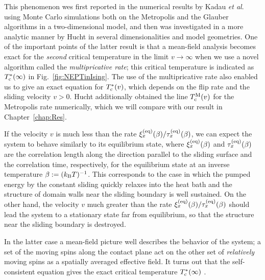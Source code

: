 This phenomenon wes first reported in the numerical results by Kadau \textit{et al}.\ \cite{Kadau2008} using Monte Carlo simulations both on the Metropolis and the Glauber algorithms in a two-dimensional model, and then was investigated in a more analytic manner by Hucht \cite{Hucht2009b} in several dimensionalities and model geometries. One of the important points of the latter result is that a mean-field analysis becomes exact for the \textit{second} critical temperature in the limit $v\to \infty$ when we use a novel algorithm called the \textit{multipricative rate}; this critical temperature is indicated as $T^{*}_{\rm c}(\infty)$ in Fig.~\ref{fig:NEPTinIsing}. The use of the multipricative rate also enabled us to give an exact equation for $T^{*}_{\rm c}(v)$, which depends on the flip rate and the sliding velocity $v>0$. Hucht additionally obtained the line $T_{\rm c}^{\rm M}(v)$ for the Metropolis rate numerically, which we will compare with our result in Chapter~\ref{chap:Res}.

If the velocity $v$ is much less than the rate $\xi^{(\rm eq)}_{x}(\beta)/\tau^{(\rm eq)}_{x}(\beta)$, we can expect the system to behave similarly to its equilibrium state, where $\xi^{(\rm eq)}_{x}(\beta)$ and $\tau^{(\rm eq)}_{x}(\beta)$ are the correlation length along the direction parallel to the sliding surface and the correlation time, respectively, for the equilibrium state at an inverse temperature $\beta:=(k_{\rm B}T)^{-1}$. This corresponds to the case in which the pumped energy by the constant sliding quickly relaxes into the heat bath and the structure of domain walls near the sliding boundary is well sustained. On the other hand, the velocity $v$ much greater than the rate $\xi^{(\rm eq)}_{x}(\beta)/\tau^{(\rm eq)}_{x}(\beta)$ should lead the system to a stationary state far from equilibrium, so that the structure near the sliding boundary is destroyed. 

In the latter case a mean-field picture \cite{Hucht2009b} well describes the behavior of the system; a set of the moving spins along the contact plane act on the other set of \textit{relatively} moving spins as a spatially averaged effective field. It turns out that the self-consistent equation gives the exact critical temperature $T^{*}_{\rm c}(\infty)$ \cite{Hucht2009b}.


